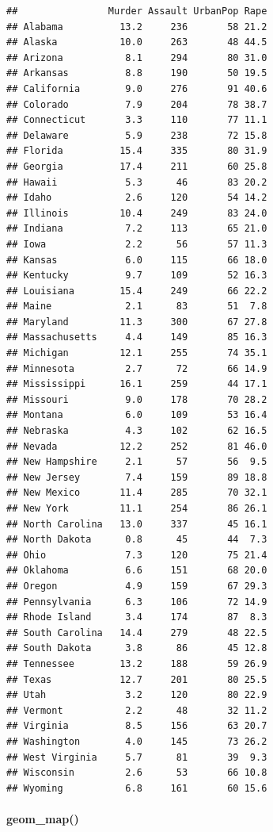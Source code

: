 \documentclass[
]{article}
\begin{document}
\begin{verbatim}
##                Murder Assault UrbanPop Rape
## Alabama          13.2     236       58 21.2
## Alaska           10.0     263       48 44.5
## Arizona           8.1     294       80 31.0
## Arkansas          8.8     190       50 19.5
## California        9.0     276       91 40.6
## Colorado          7.9     204       78 38.7
## Connecticut       3.3     110       77 11.1
## Delaware          5.9     238       72 15.8
## Florida          15.4     335       80 31.9
## Georgia          17.4     211       60 25.8
## Hawaii            5.3      46       83 20.2
## Idaho             2.6     120       54 14.2
## Illinois         10.4     249       83 24.0
## Indiana           7.2     113       65 21.0
## Iowa              2.2      56       57 11.3
## Kansas            6.0     115       66 18.0
## Kentucky          9.7     109       52 16.3
## Louisiana        15.4     249       66 22.2
## Maine             2.1      83       51  7.8
## Maryland         11.3     300       67 27.8
## Massachusetts     4.4     149       85 16.3
## Michigan         12.1     255       74 35.1
## Minnesota         2.7      72       66 14.9
## Mississippi      16.1     259       44 17.1
## Missouri          9.0     178       70 28.2
## Montana           6.0     109       53 16.4
## Nebraska          4.3     102       62 16.5
## Nevada           12.2     252       81 46.0
## New Hampshire     2.1      57       56  9.5
## New Jersey        7.4     159       89 18.8
## New Mexico       11.4     285       70 32.1
## New York         11.1     254       86 26.1
## North Carolina   13.0     337       45 16.1
## North Dakota      0.8      45       44  7.3
## Ohio              7.3     120       75 21.4
## Oklahoma          6.6     151       68 20.0
## Oregon            4.9     159       67 29.3
## Pennsylvania      6.3     106       72 14.9
## Rhode Island      3.4     174       87  8.3
## South Carolina   14.4     279       48 22.5
## South Dakota      3.8      86       45 12.8
## Tennessee        13.2     188       59 26.9
## Texas            12.7     201       80 25.5
## Utah              3.2     120       80 22.9
## Vermont           2.2      48       32 11.2
## Virginia          8.5     156       63 20.7
## Washington        4.0     145       73 26.2
## West Virginia     5.7      81       39  9.3
## Wisconsin         2.6      53       66 10.8
## Wyoming           6.8     161       60 15.6
\end{verbatim}

\hypertarget{geom_map}{%
\paragraph{geom\_map()}\label{geom_map}}
\end{document}
